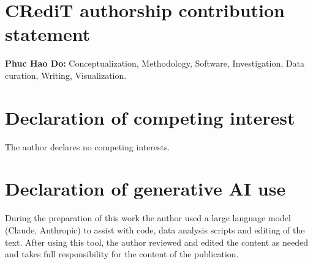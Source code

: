\documentclass[preprint,11pt,3p]{elsarticle}
\begin{document}
\section*{CRediT authorship contribution statement}
\textbf{Phuc Hao Do:} Conceptualization, Methodology, Software, Investigation, Data curation,
Writing, Visualization.

\section*{Declaration of competing interest}
The author declares no competing interests.

\section*{Declaration of generative AI use}
During the preparation of this work the author used a large language model (Claude, Anthropic)
to assist with code, data analysis scripts and editing of the text. After using this tool, the
author reviewed and edited the content as needed and takes full responsibility for the content
of the publication.



\end{document}
